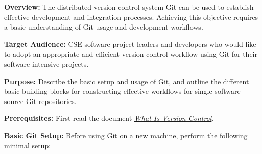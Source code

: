 \documentclass[]{article}
\date{}
\begin{document}
\pagestyle{fancy}
\renewcommand{\headrulewidth}{0pt}
  
\thispagestyle{empty}
\textbf{\newline}
\textbf{\newline}
\textbf{\newline}

\textbf{Overview:} The distributed version control system Git can be
used to establish effective development and integration processes.
Achieving this objective requires a basic understanding of Git usage and
development workflows.

\textbf{Target Audience:} CSE software project leaders and developers
who would like to adopt an appropriate and efficient version control
workflow using Git for their software-intensive projects.

\textbf{Purpose:} Describe the basic setup and usage of Git, and outline
the different basic building blocks for constructing effective workflows
for single software source Git repositories.

\textbf{Prerequisites:} First read the document
\href{https://docs.google.com/document/d/1LHT4e-BjB31BcCSL42xSI5GBNCNpQ-SS5K5iyStH6sw}{\emph{What
Is Version Control}}.

\textbf{Basic Git Setup:} Before using Git on a new machine, perform the
following minimal setup:
\end{document}
